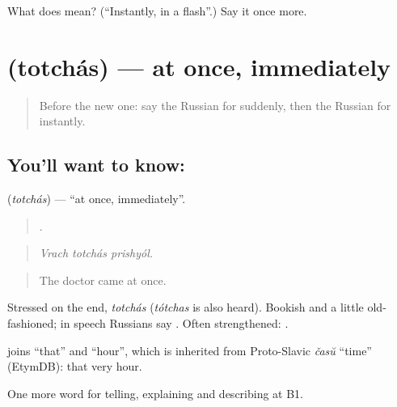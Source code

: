 \begin{tcolorbox}[breakable,colback=teal!4,colframe=teal!35!black,title={Before you move on}]
What does  mean? (\textquotedblleft{}Instantly, in a flash\textquotedblright{}.) Say it once more.
\end{tcolorbox}
\section[\texorpdfstring{\ru{тотчас} (totchás)}{тотчас (totchás)}]{ (totchás) — at once, immediately}

\label{lesson:RU-C271-totchas}



\begin{quote}
Before the new one: say the Russian for suddenly, then the Russian for instantly.
\end{quote}

\subsection*{You'll want to know: }
\textbf{} (\emph{totchás}) — \textquotedblleft{}at once, immediately\textquotedblright{}.

\begin{quote}
  .
\end{quote}

\begin{quote}
\emph{Vrach totchás prishyól.}
\end{quote}

\begin{quote}
The doctor came at once.
\end{quote}

Stressed on the end, \emph{totchás} (\emph{tótchas} is also heard). Bookish and a little old-fashioned; in speech Russians say \emph{}. Often strengthened: \emph{ }.

\begin{cousinweb}
\emph{} joins \emph{} \textquotedblleft{}that\textquotedblright{} and \emph{} \textquotedblleft{}hour\textquotedblright{}, which is inherited from Proto-Slavic \emph{časŭ} \textquotedblleft{}time\textquotedblright{} (EtymDB): that very hour.
\end{cousinweb}

\begin{grammarlens}[title={What you've built}]
One more word for telling, explaining and describing at B1.
\end{grammarlens}

